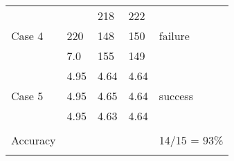 \documentclass{article}
\begin{document}
\begin{table}[h]
\begin{tabular}{ | m{1.5cm} | m{2.5cm} | m{2.85cm}  m{2.3cm} | m{1.5cm} |   }
      &   &\hspace{0.65cm} 218  &\hspace{0.45cm} 222 & \\ 
 
    Case 4  & 220 &\hspace{0.65cm} 148 &\hspace{0.45cm} 150  & failure  \\ 
    
      & 7.0 &\hspace{0.65cm} 155 &\hspace{0.45cm} 149 &   \\
      \hline
      
         & 4.95  &\hspace{0.65cm} 4.64 &\hspace{0.45cm} 4.64 & \\ 
  
   Case 5   & 4.95 &\hspace{0.65cm} 4.65  &\hspace{0.45cm} 4.64 & success  \\ 
    
      &4.95 &\hspace{0.65cm} 4.63 &\hspace{0.45cm} 4.64 &   \\ 
      \hline
               &   &  &  & \\ 
  
   Accuracy  &   &  &  & 14/15 = 93\% \\ 
    
      &  &  &  &   \\ 
      \hline
      
\end{tabular}
\end{table}
\end{document}
